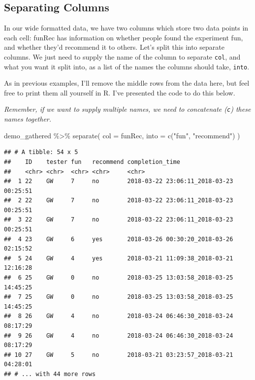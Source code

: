 \documentclass[
]{book}
\newenvironment{Shaded}{\begin{snugshade}}{\end{snugshade}}
\newcommand{\AttributeTok}[1]{\textcolor[rgb]{0.77,0.63,0.00}{#1}}
\newcommand{\FunctionTok}[1]{\textcolor[rgb]{0.00,0.00,0.00}{#1}}
\newcommand{\NormalTok}[1]{#1}
\newcommand{\SpecialCharTok}[1]{\textcolor[rgb]{0.00,0.00,0.00}{#1}}
\newcommand{\StringTok}[1]{\textcolor[rgb]{0.31,0.60,0.02}{#1}}
\begin{document}
\hypertarget{separating-columns}{%
\subsection{Separating Columns}\label{separating-columns}}

In our wide formatted data, we have two columns which store two data points in each cell: funRec has information on whether people found the experiment fun, and whether they'd recommend it to others. Let's split this into separate columns. We just need to supply the name of the column to separate \texttt{col}, and what you want it split into, as a list of the names the columns should take, \texttt{into}.

As in previous examples, I'll remove the middle rows from the data here, but feel free to print them all yourself in R. I've presented the code to do this below.

\emph{Remember, if we want to supply multiple names, we need to concatenate (\texttt{c}) these names together.}

\begin{Shaded}
\begin{Highlighting}[]
\NormalTok{demo\_gathered }\SpecialCharTok{\%\textgreater{}\%}
  \FunctionTok{separate}\NormalTok{(}
    \AttributeTok{col =}\NormalTok{ funRec,}
    \AttributeTok{into =} \FunctionTok{c}\NormalTok{(}\StringTok{"fun"}\NormalTok{, }\StringTok{"recommend"}\NormalTok{)}
\NormalTok{    )}
\end{Highlighting}
\end{Shaded}

\begin{verbatim}
## # A tibble: 54 x 5
##    ID    tester fun   recommend completion_time                        
##    <chr> <chr>  <chr> <chr>     <chr>                                  
##  1 22    GW     7     no        2018-03-22 23:06:11_2018-03-23 00:25:51
##  2 22    GW     7     no        2018-03-22 23:06:11_2018-03-23 00:25:51
##  3 22    GW     7     no        2018-03-22 23:06:11_2018-03-23 00:25:51
##  4 23    GW     6     yes       2018-03-26 00:30:20_2018-03-26 02:15:52
##  5 24    GW     4     yes       2018-03-21 11:09:38_2018-03-21 12:16:28
##  6 25    GW     0     no        2018-03-25 13:03:58_2018-03-25 14:45:25
##  7 25    GW     0     no        2018-03-25 13:03:58_2018-03-25 14:45:25
##  8 26    GW     4     no        2018-03-24 06:46:30_2018-03-24 08:17:29
##  9 26    GW     4     no        2018-03-24 06:46:30_2018-03-24 08:17:29
## 10 27    GW     5     no        2018-03-21 03:23:57_2018-03-21 04:28:01
## # ... with 44 more rows
\end{verbatim}
\end{document}
